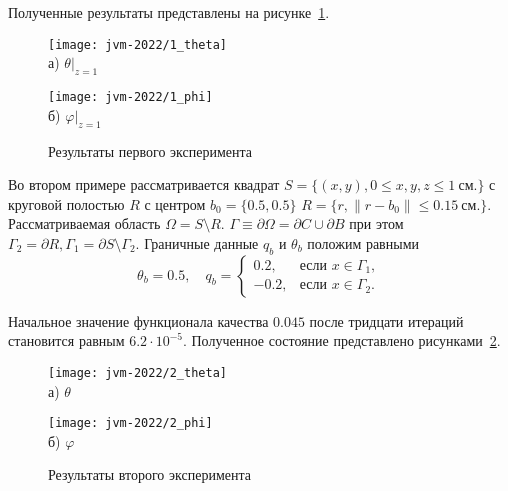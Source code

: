 Полученные результаты представлены на рисунке~\ref{fig:4_4:5}.
\begin{figure}[h!t]
    \begin{minipage}[b][][b]{0.49\linewidth}
        \centering
        \texttt{[image: jvm-2022/1\_theta]}
        \\ а) $\theta|_{z=1}$
    \end{minipage}
    \hfill
    \begin{minipage}[b][][b]{0.49\linewidth}
        \centering
        \texttt{[image: jvm-2022/1\_phi]}
        \\ б) $\varphi|_{z=1}$
    \end{minipage}
    \caption{Результаты первого эксперимента}
    \label{fig:4_4:5}
\end{figure}


Во втором примере рассматривается квадрат
$S = \{(x, y), 0 \leq x,y,z \leq 1~\text{см.}\}$ с
круговой полостью $R$ с центром $b_0 =\{0.5, 0.5\}$
$R = \{r, \| r - b_0 \| \leq 0.15~\text{см.} \}$.
Рассматриваемая область $\Omega = S \setminus R$.
$\Gamma \equiv \partial \Omega = \partial C \cup \partial B$ при этом
$ \Gamma_2 = \partial R, \Gamma_1 = \partial S \setminus \Gamma_2$.
Граничные данные $q_b$ и $\theta_b$ положим равными
\[
    \theta_b = 0.5, \quad
    q_b =
    \begin{cases}
        0.2, & \text{если } x \in \Gamma_1, \\
        -0.2, & \text{если } x \in \Gamma_2.
    \end{cases}
\]

Начальное значение функционала качества $0.045$
после тридцати итераций становится равным $6.2\cdot10^{-5}$.
Полученное состояние представлено рисунками~\ref{fig:4_4:6}.

\begin{figure}[h!t]
    \begin{minipage}[b][][b]{0.49\linewidth}
        \centering
        \texttt{[image: jvm-2022/2\_theta]}
        \\ а) $\theta$
    \end{minipage}
    \hfill
    \begin{minipage}[b][][b]{0.49\linewidth}
        \centering
        \texttt{[image: jvm-2022/2\_phi]}
        \\ б) $\varphi$
    \end{minipage}
    \caption{Результаты второго эксперимента}
    \label{fig:4_4:6}
\end{figure}


